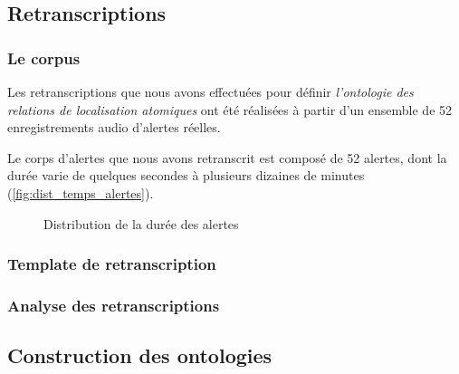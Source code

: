
\subsection{Retranscriptions}

\subsubsection{Le corpus}

Les retranscriptions que nous avons effectuées pour définir
\emph{l'ontologie des relations de localisation atomiques} ont été
réalisées à partir d'un ensemble de 52 enregistrements audio d'alertes
réelles.

Le corps d'alertes que nous avons retranscrit est composé de 52
alertes, dont la durée varie de quelques secondes à plusieurs dizaines
de minutes (\autoref{fig:dist_temps_alertes}).

\begin{figure}
  \centering
  
  \caption{Distribution de la durée des alertes}
  \label{fig:dist_temps_alertes}
\end{figure}

\subsubsection{Template de retranscription}

\subsubsection{Analyse des retranscriptions}

\subsection{Construction des ontologies}

